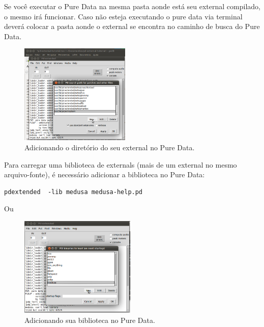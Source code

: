 \documentclass[10pt,a4paper]{report}
\begin{document}
Se você executar o Pure Data na mesma pasta aonde está seu external compilado, o mesmo irá funcionar. Caso não esteja executando o pure data via terminal deverá colocar a pasta aonde o external se encontra no caminho de busca do Pure Data.
\begin{figure}[h!]
	\centering
	\includegraphics[height=180]{./images/path}
	\caption{Adicionando o diretório do seu external no Pure Data.}
\end{figure}

Para carregar uma biblioteca de externals (mais de um external no mesmo arquivo-fonte), é necessário adicionar a biblioteca no Pure Data:

 
\begin{lstlisting}
pdextended  -lib medusa medusa-help.pd 
\end{lstlisting}

Ou 

\begin{figure}[h!]
	\centering
	\includegraphics[height=180]{./images/startup}
	\caption{Adicionando sua biblioteca no Pure Data.}
\end{figure}
\end{document}
